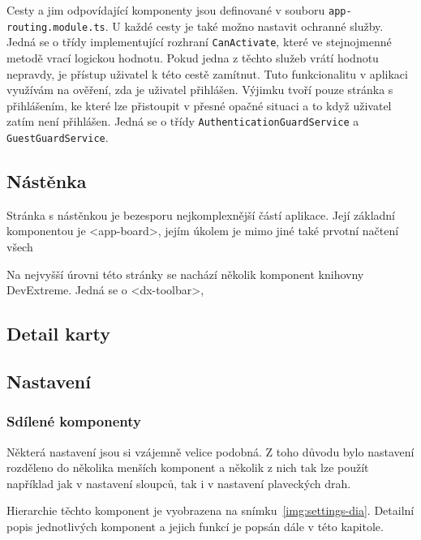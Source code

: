 Cesty a jim odpovídající komponenty jsou definované v souboru \texttt{app-routing.module.ts}. U každé cesty je také možno nastavit ochranné služby. Jedná se o třídy implementující rozhraní \texttt{CanActivate}, které ve stejnojmenné metodě vrací logickou hodnotu. Pokud jedna z těchto služeb vrátí hodnotu nepravdy, je přístup uživatel k této cestě zamítnut. Tuto funkcionalitu v aplikaci využívám na ověření, zda je uživatel přihlášen. Výjimku tvoří pouze stránka s přihlášením, ke které lze přistoupit v přesné opačné situaci a to když uživatel zatím není přihlášen. Jedná se o třídy \texttt{AuthenticationGuardService} a \texttt{GuestGuardService}.


\subsection{Nástěnka}
Stránka s nástěnkou je bezesporu nejkomplexnější částí aplikace. Její základní komponentou je <app-board>, jejím úkolem je mimo jiné také prvotní načtení všech %

Na nejvyšší úrovni této stránky se nachází několik komponent knihovny DevExtreme. Jedná se o <dx-toolbar>, %



\subsection{Detail karty}
\blindtext


\subsection{Nastavení}
\blindtext


\subsubsection{Sdílené komponenty}
Některá nastavení jsou si vzájemně velice podobná. Z toho důvodu bylo nastavení rozděleno do několika menších komponent a několik z nich tak lze použít například jak v nastavení sloupců, tak i v nastavení plaveckých drah.

Hierarchie těchto komponent je vyobrazena na snímku~\ref{img:settings-dia}. Detailní popis jednotlivých komponent a jejich funkcí je popsán dále v této kapitole.


